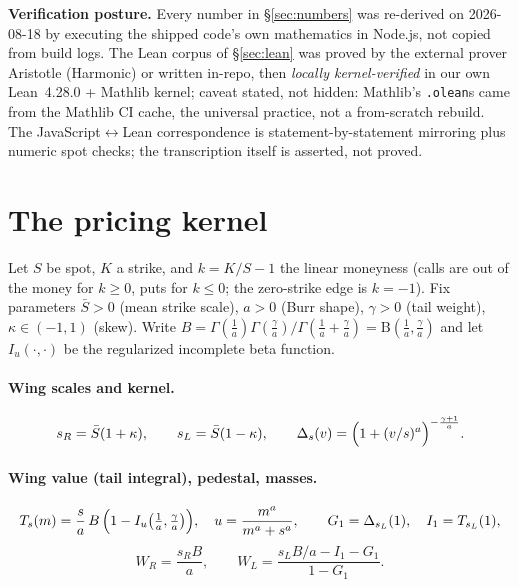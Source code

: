 \documentclass[11pt]{article}
\newcommand{\Sbar}{\bar{S}}
\newcommand{\ib}{I}
\begin{document}
\textbf{Verification posture.} Every number in \S\ref{sec:numbers} was re-derived on 2026-08-18
by executing the shipped code's own mathematics in Node.js, not copied from build logs. The Lean
corpus of \S\ref{sec:lean} was proved by the external prover Aristotle (Harmonic) or written
in-repo, then \emph{locally kernel-verified} in our own Lean~4.28.0 + Mathlib kernel; caveat
stated, not hidden: Mathlib's \texttt{.olean}s came from the Mathlib CI cache, the universal
practice, not a from-scratch rebuild. The JavaScript$\leftrightarrow$Lean correspondence is
statement-by-statement mirroring plus numeric spot checks; the transcription itself is asserted,
not proved.

\section{The pricing kernel}\label{sec:kernel}

Let $S$ be spot, $K$ a strike, and $k = K/S - 1$ the linear moneyness (calls are out of the money
for $k\ge 0$, puts for $k\le 0$; the zero-strike edge is $k=-1$). Fix parameters
$\Sbar>0$ (mean strike scale), $a>0$ (Burr shape), $\gamma>0$ (tail weight), $\kappa\in(-1,1)$
(skew). Write $B = \Gamma(\tfrac1a)\Gamma(\tfrac\gamma a)/\Gamma(\tfrac1a+\tfrac\gamma a)
= \mathrm{B}(\tfrac1a,\tfrac\gamma a)$ and let $\ib_u(\cdot,\cdot)$ be the regularized
incomplete beta function.

\paragraph{Wing scales and kernel.}
\begin{equation}
s_R = \Sbar(1+\kappa), \qquad s_L = \Sbar(1-\kappa), \qquad
\Delta_s(v) = \Bigl(1 + (v/s)^a\Bigr)^{-\frac{\gamma+1}{a}} .
\end{equation}

\paragraph{Wing value (tail integral), pedestal, masses.}
\begin{equation}
T_s(m) = \frac{s}{a}\,B\,\Bigl(1 - \ib_{u}\bigl(\tfrac1a,\tfrac\gamma a\bigr)\Bigr),
\quad u = \frac{m^a}{m^a + s^a}, \qquad
G_1 = \Delta_{s_L}(1), \quad I_1 = T_{s_L}(1),
\end{equation}
\begin{equation}
W_R = \frac{s_R B}{a}, \qquad
W_L = \frac{s_L B/a - I_1 - G_1}{1 - G_1} .
\end{equation}
\end{document}
